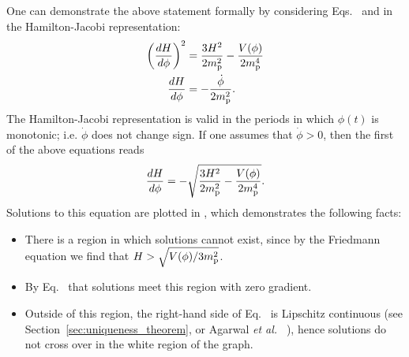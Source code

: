 One can demonstrate the above statement formally by considering
Eqs.\  and
 in the Hamilton-Jacobi
representation:
%
\begin{align}
  \left(\frac{dH}{d\phi}\right)^2
  &=
  \frac{3H^2}{2m_{\mathrm{p}}^2} - \frac{V(\phi)}{2m_{\mathrm{p}}^4}
  \\
  \frac{dH}{d\phi}
  &=
  -\frac{\dot{\phi}}{2m_{\mathrm{p}}^2}.
\end{align}
%
The Hamilton-Jacobi representation is valid in the periods in which
$\phi(t)$ is monotonic; i.e. $\dot{\phi}$ does not change sign. If one
assumes that $\dot{\phi}>0$, then the first of the above equations
reads
%
\begin{equation}
  \frac{dH}{d\phi} 
  = 
  -\sqrt{\frac{3H^2}{2m_{\mathrm{p}}^2} - \frac{V(\phi)}{2m_{\mathrm{p}}^4}}.
  \label{eqn:Hamilton_Jacobi_H}
\end{equation}
%
Solutions to this equation are plotted in , which
demonstrates the following facts: 
%
\begin{itemize}
  \item There is a region in which solutions cannot exist, since by
    the Friedmann equation
     we find that
    $H>\sqrt{V(\phi)/3m_{\mathrm{p}}^2}$.
  \item  By Eq.\  that solutions meet
    this region with zero gradient.
  \item Outside of this region, the right-hand side of Eq.\ 
     is Lipschitz continuous (see
    Section~\ref{sec:uniqueness_theorem}, or Agarwal {\it et al.\ }
    \citep{agarwal_1993}), hence solutions do not cross over in the
    white region of the graph.
\end{itemize}
% 

